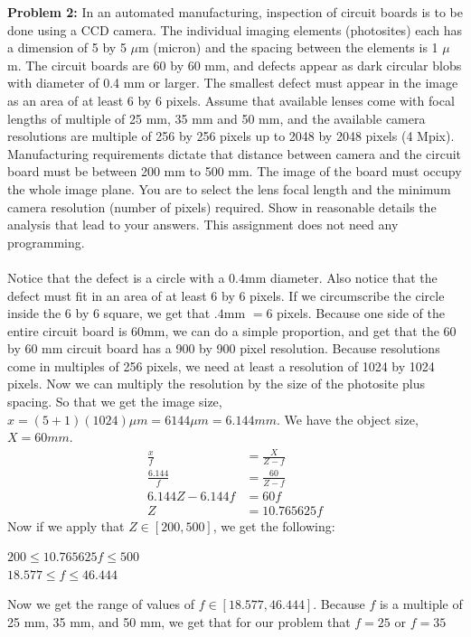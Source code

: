 \documentclass[11pt]{article}
\newenvironment{problem}[1]{\textbf{Problem #1: }}{\newpage}
\begin{document}
	\begin{problem}{2}
		In an automated manufacturing, inspection of circuit boards is to be done using a CCD camera. The individual imaging elements (photosites) each has a dimension of 5 by 5 $\mu$m (micron) and the spacing between the elements is 1 $\mu$m. The circuit boards are 60 by 60 mm, and defects appear as dark circular blobs with diameter of 0.4 mm or larger.  The smallest defect must appear in the image as an area of at least 6 by 6 pixels. Assume that available lenses come with focal lengths of multiple of 25 mm, 35 mm and 50 mm, and the available camera resolutions are multiple of 256 by 256 pixels up to 2048 by 2048 pixels (4 Mpix).  Manufacturing requirements dictate that distance between camera and the circuit board must be between 200 mm to 500 mm. The image of the board must occupy the whole image plane. You are to select the lens focal length and the minimum camera resolution (number of pixels) required.  Show in reasonable details the analysis that lead to your answers. This assignment does not need any programming. 
		\\ \\
		Notice that the defect is a circle with a $0.4$mm diameter.  Also notice that the defect must fit in an area of at least 6 by 6 pixels.  If we circumscribe the circle inside the 6 by 6 square, we get that $.4$mm $= 6$ pixels.  Because one side of the entire circuit board is 60mm, we can do a simple proportion, and get that the 60 by 60 mm circuit board has a 900 by 900 pixel resolution.  Because resolutions come in multiples of 256 pixels, we need at least a resolution of 1024 by 1024 pixels.  Now we can multiply the resolution by the size of the photosite plus spacing.  So that we get the image size, $x = (5 + 1)(1024)\mu m = 6144\mu m = 6.144mm$.  We have the object size, $X = 60mm$. 
		\begin{align*}
			\frac{x}{f} &= \frac{X}{Z - f} \\
			\frac{6.144}{f} &= \frac{60}{Z - f} \\
			6.144Z - 6.144f &= 60f \\
			Z &= 10.765625f
		\end{align*}  
		Now if we apply that $Z \in {[200,500]}$, we get the following:
		\begin{center}
			$200 \leq 10.765625f \leq 500$ \\
			$18.577 \leq f \leq 46.444$
		\end{center}
		Now we get the range of values of $f \in {[18.577, 46.444]}$.  Because $f$ is a multiple of 25 mm, 35 mm, and 50 mm, we get that for our problem that $f = 25$ or $f = 35$
	\end{problem}
\end{document}
